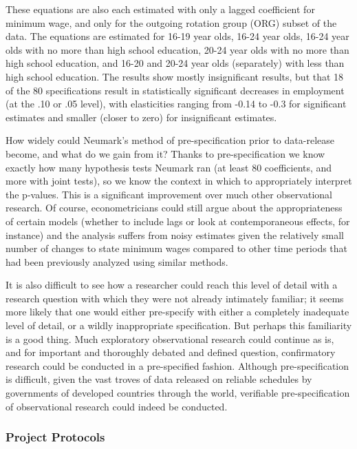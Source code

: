 \documentclass[12pt] {article}
\begin{document}
These equations are also each estimated with only a lagged coefficient for minimum wage, and only for the outgoing rotation group (ORG) subset of the data. The equations are estimated for 16-19 year olds, 16-24 year olds, 16-24 year olds with no more than high school education, 20-24 year olds with no more than high school education, and 16-20 and 20-24 year olds (separately) with less than high school education. The results show mostly insignificant results, but that 18 of the 80 specifications result in statistically significant decreases in employment (at the .10 or .05 level), with elasticities ranging from -0.14 to -0.3 for significant estimates and smaller (closer to zero) for insignificant estimates. 

How widely could Neumark's method of pre-specification prior to data-release become, and what do we gain from it? Thanks to pre-specification we know exactly how many hypothesis tests Neumark ran (at least 80 coefficients, and more with joint tests), so we know the context in which to appropriately interpret the p-values. This is a significant improvement over much other observational research. Of course, econometricians could still argue about the appropriateness of certain models (whether to include lags or look at contemporaneous effects, for instance) and the analysis suffers from noisy estimates given the relatively small number of changes to state minimum wages compared to other time periods that had been previously analyzed using similar methods.  

It is also difficult to see how a researcher could reach this level of detail with a research question with which they were not already intimately familiar; it seems more likely that one would either pre-specify with either a completely inadequate level of detail, or a wildly inappropriate specification. But perhaps this familiarity is a good thing. Much exploratory observational research could continue as is, and for important and thoroughly debated and defined question, confirmatory research could be conducted in a pre-specified fashion. Although pre-specification is difficult, given the vast troves of data released on reliable schedules by governments of developed countries through the world, verifiable pre-specification of observational research could indeed be conducted.

\subsubsection{Project Protocols}\label{project-protocols}
\end{document}
